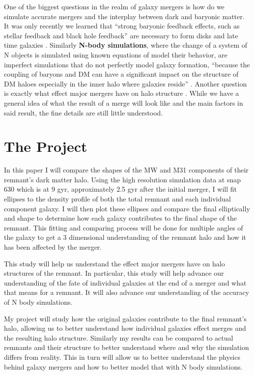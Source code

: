 \documentclass[fleqn,usenatbib]{mnras}
\begin{document}
One of the biggest questions in the realm of galaxy mergers is how do we simulate accurate mergers and the interplay between dark and baryonic matter. It was only recently we learned that “strong baryonic feedback effects, such as stellar feedback and black hole feedback” are necessary to form disks and late time galaxies \cite{10.1093/mnras/stz2873}. Similarly \textbf{N-body simulations}, where the change of a system of N objects is simulated using known equations of model their behavior,  are imperfect simulations that do not perfectly model galaxy formation, “because the coupling of baryons and DM can have a significant impact on the structure of DM haloes especially in the inner halo where galaxies reside” \cite{10.1093/mnras/sty3531}. Another question is exactly what effect major mergers have on halo structure \cite{10.1093/mnras/stz1306}. While we have a general idea of what the result of a merge will look like and the main factors in said result, the fine details are still little understood.


\section{The Project}

In this paper I will compare the shapes of the MW and M31 components of their remnant’s dark matter halo. Using the high resolution simulation data at snap 630 which is at 9 gyr, approximately 2.5 gyr after the initial merger, I will fit ellipses to the density profile of both the total remnant and each individual component galaxy. I will then plot these ellipses and compare the final elliptically and shape to determine how each galaxy contributes to the final shape of the remnant. This fitting and comparing process will be done for multiple angles of the galaxy to get a 3 dimensional understanding of the remnant halo and how it has been affected by the merger.

This study will help us understand the effect major mergers have on halo structures of the remnant. In particular, this study will help advance our understanding of the fate of individual galaxies at the end of a merger and what that means for a remnant. It will also advance our understanding of the accuracy of N body simulations. 

My project will study how the original galaxies contribute to the final remnant's halo, allowing us to better understand how individual galaxies effect merges and the resulting halo structure. Similarly my results can be compared to actual remnants and their structure to better understand where and why the simulation differs from reality. This in turn will allow us to better understand the physics behind galaxy mergers and how to better model that with N body simulations.
\end{document}
